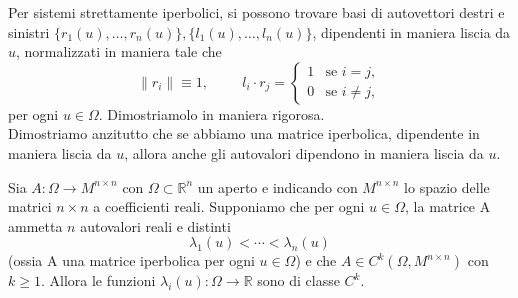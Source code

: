 Per sistemi strettamente iperbolici, si possono trovare basi di autovettori destri e sinistri $\{r_{1}(u),\ldots,r_{n}(u)\}, \{l_{1}(u),\ldots,l_{n}(u)\}$, dipendenti in maniera liscia da $u$, normalizzati in maniera tale che
\begin{equation}\label{eq:2.23}
    \|r_{i}\|\equiv 1, \hspace{1cm} l_{i}\cdot r_{j} = 
    \begin{cases}
        1 & \text{se } i = j,
        \\0 & \text{se } i\neq j, 
    \end{cases}
\end{equation}
per ogni $u\in\Omega$. Dimostriamolo in maniera rigorosa.\\
Dimostriamo anzitutto che se abbiamo una matrice iperbolica, dipendente in maniera liscia da $u$, allora anche gli autovalori dipendono in maniera liscia da $u$.
\begin{teorema}
    Sia $A\colon\Omega\rightarrow M^{n\times n}$ con $\Omega\subset\mathbb{R}^{n}$ un aperto e indicando con $M^{n\times n}$ lo spazio delle matrici $n\times n$ a coefficienti reali. Supponiamo che per ogni $u\in\Omega$, la matrice A ammetta $n$ autovalori reali e distinti
    $$\lambda_{1}(u)<\cdots <\lambda_{n}(u)$$
    (ossia A  una matrice iperbolica per ogni $u\in\Omega$) e che $A\in C^{k}(\Omega, M^{n\times n})$ con $k\geq 1$.
    Allora le funzioni $\lambda_{i}(u)\colon\Omega\rightarrow\mathbb{R}$ sono di classe $C^{k}$.
\end{teorema}
